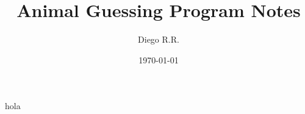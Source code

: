 \documentclass[12pt]{extarticle}
\title{Animal Guessing Program Notes}
\author{Diego R.R.}
\date{\today}
\begin{document}
\maketitle
hola
\end{document}
